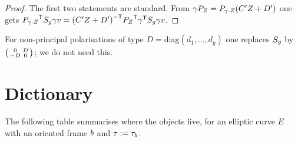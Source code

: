 \begin{proof}
The first two statements are standard. From
$\gamma P_{Z} = P_{\gamma\cdot Z}(C'Z+D')$ one gets
${P_{\gamma\cdot Z}}^{\mathsf{T}}S_{g}\gamma v =
{(C'Z+D')}^{-\mathsf{T}}{P_{Z}}^{\mathsf{T}}{\gamma}^{\mathsf{T}}
S_{g}\gamma v$.
\end{proof}

\begin{remark}
For non-principal polarisations of type $D = \mathrm{diag}(d_1, \ldots, d_g)$
one replaces $S_{g}$ by $\left(\begin{smallmatrix} 0 & D \\ -D & 0 \end{smallmatrix}\right)$; we do not need
this.
\end{remark}

\section{Dictionary}

The following table summarises where the objects live, for an elliptic
curve $E$ with an oriented frame $b$ and $\tau := \tau_{b}$.

